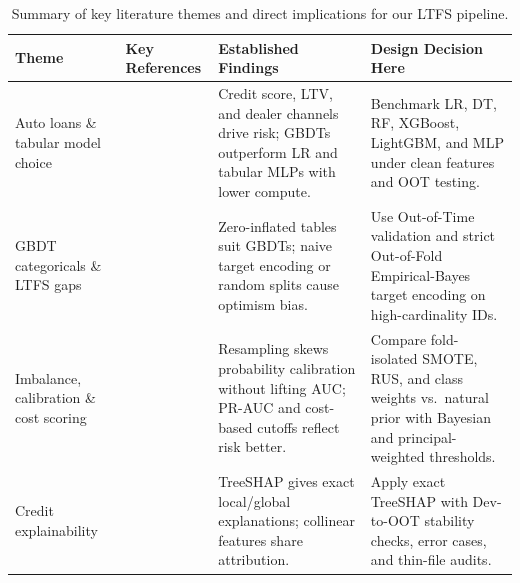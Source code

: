 \begin{table}[htbp]
  \centering
  \caption{Summary of key literature themes and direct implications for our LTFS pipeline.}
  \label{tab:lit_summary}
  \footnotesize
  \begin{tabularx}{\textwidth}{@{}L{3.4cm} L{2.8cm} Y Y@{}}
    \toprule
    \textbf{Theme} & \textbf{Key References} & \textbf{Established Findings} & \textbf{Design Decision Here} \\
    \midrule
    Auto loans \& tabular model choice & \cite{agarwal2008,baesens2003,lessmann2015,gunnarsson2021,grinsztajn2022} & Credit score, LTV, and dealer channels drive risk; GBDTs outperform LR and tabular MLPs with lower compute. & Benchmark LR, DT, RF, XGBoost, LightGBM, and MLP under clean features and OOT testing. \\[3pt]
    GBDT categoricals \& LTFS gaps & \cite{chen2016,ke2017,wu2025,miccibarreca2001} & Zero-inflated tables suit GBDTs; naive target encoding or random splits cause optimism bias. & Use Out-of-Time validation and strict Out-of-Fold Empirical-Bayes target encoding on high-cardinality IDs. \\[3pt]
    Imbalance, calibration \& cost scoring & \cite{chawla2002,goorbergh2022,saito2015,elkan2001,bahnsen2014} & Resampling skews probability calibration without lifting AUC; PR-AUC and cost-based cutoffs reflect risk better. & Compare fold-isolated SMOTE, RUS, and class weights vs.\ natural prior with Bayesian and principal-weighted thresholds. \\[3pt]
    Credit explainability & \cite{lundberg2017,lundberg2020,bussmann2021} & TreeSHAP gives exact local/global explanations; collinear features share attribution. & Apply exact TreeSHAP with Dev-to-OOT stability checks, error cases, and thin-file audits. \\
    \bottomrule
  \end{tabularx}
\end{table}
